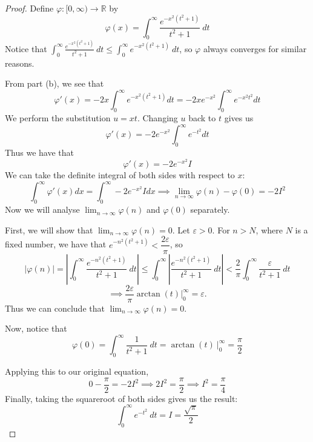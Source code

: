 \documentclass{article}
\theoremstyle{plain} %
\numberwithin{thm}{section} %
\theoremstyle{definition}
\begin{document}
\begin{proof}
            Define \(\varphi : [0,\infty) \to  \mathbb{R}\) by
            \[
                \varphi (x) = \int _0^{\infty} \frac{e^{-x^2(t^2 + 1)}}{t^{2} +1}\ dt
            \]
            Notice that \(\int _0^{\infty} \frac{e^{-x^2(t^2 + 1)}}{t^{2} +1}\ dt \leq \int _0^{\infty} e^{-x^2(t^2 + 1)}\ dt\), so \(\varphi\) always converges for similar reasons.

            From part (b), we see that
            \[
                \varphi '(x) = -2x\int _0^{\infty} e^{-x^2 (t^2 + 1)}dt = -2xe^{-x^2}\int _0^{\infty} e^{-x^2 t^2}dt
            \]
            We perform the substitution \(u = xt\). Changing \(u\) back to \(t\) gives us
            \[
                \varphi '(x) = -2e^{-x^2}\int _0^{\infty} e^{-t^2}dt
            \]
            Thus we have that
            \[
                \varphi '(x) = -2e^{-x^2}I
            \]
            We can take the definite integral of both sides with respect to \(x\):
            \[
                \int _0 ^{\infty} \varphi '(x) dx = \int _0^{\infty} -2e^{-x^2}I dx \implies \lim_{n \to \infty} \varphi (n) - \varphi (0) = -2I^2
            \]
            Now we will analyse \(\lim_{n \to \infty} \varphi (n)\) and \(\varphi (0)\) separately.

            First, we will show that \(\lim_{n \to \infty} \varphi (n) = 0\). Let \(\varepsilon > 0\). For \(n > N\), where \(N\) is a fixed number, we have that \(e^{-n^2(t^2 +1)} < \dfrac{2\varepsilon}{\pi}\), so
            \[
                |\varphi (n)| = \left\vert \int _0^{\infty} \frac{e^{-n^2(t^2 + 1)}}{t^{2} +1}\ dt \right\vert \leq \int _0^{\infty} \left\vert \frac{e^{-n^2(t^2 + 1)}}{t^{2} +1}\ dt \right\vert < \frac{2}{\pi} \int _0^{\infty} \frac{\varepsilon}{t^2 + 1}\ dt
            \]
            \[
                \implies \frac{2\varepsilon}{\pi} \arctan (t) \Big| _0^{\infty} = \varepsilon.
            \]
            Thus we can conclude that \(\lim_{n \to \infty} \varphi (n) = 0\).

            Now, notice that
            \[
                \varphi (0) = \int _0^{\infty} \frac{1}{t^2 + 1} \ dt = \arctan (t) \ \Big|_0^{\infty} = \frac{\pi}{2}
            \]

            Applying this to our original equation,
            \[
                0 - \frac{\pi}{2} = -2I^2 \implies 2I^2 = \frac{\pi}{2} \implies I^2 = \frac{\pi}{4}
            \]
            Finally, taking the squareroot of both sides gives us the result:
            \[
                \int_0^\infty e^{- t^2} \ dt = I = \frac{\sqrt{\pi}}{2}
            \]
        \end{proof}
        
\end{document}
